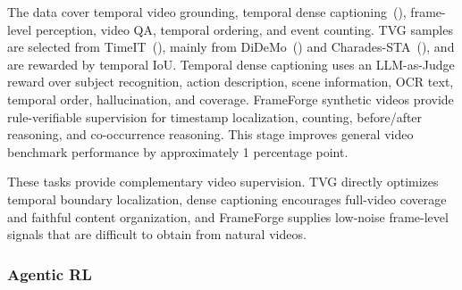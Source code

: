 \documentclass{article} %
\begin{document}
The data cover temporal video grounding, temporal dense captioning~(\cite{vcap}), frame-level perception, video QA, temporal ordering, and event counting. TVG samples are selected from TimeIT~(\cite{timeit}), mainly from DiDeMo~(\cite{didemo}) and Charades-STA~(\cite{charades_sta}), and are rewarded by temporal IoU. Temporal dense captioning uses an LLM-as-Judge reward over subject recognition, action description, scene information, OCR text, temporal order, hallucination, and coverage. FrameForge synthetic videos provide rule-verifiable supervision for timestamp localization, counting, before/after reasoning, and co-occurrence reasoning. This stage improves general video benchmark performance by approximately 1 percentage point.

These tasks provide complementary video supervision. TVG directly optimizes temporal boundary localization, dense captioning encourages full-video coverage and faithful content organization, and FrameForge supplies low-noise frame-level signals that are difficult to obtain from natural videos.

\subsubsection{Agentic RL}


\end{document}

